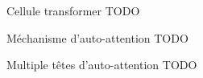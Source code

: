 \begin{frame}{Cellule transformer}
    \alert{TODO}
\end{frame}

\begin{frame}{Méchanisme d'auto-attention}
    \alert{TODO}
\end{frame}

\begin{frame}{Multiple têtes d'auto-attention}
    \alert{TODO}
\end{frame}
